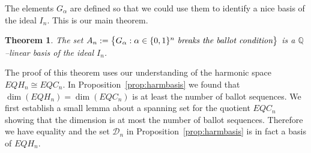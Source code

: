 \documentclass[submission]{FPSAC2023}
\newcommand{\defncolor}{\color{darkred}}
\newcommand{\defn}[1]{{\defncolor\emph{#1}}} %
\newtheorem{theorem}{Theorem}[section]
\theoremstyle{definition}
\newtheorem{example}[theorem]{Example}
\numberwithin{equation}{section}
\begin{document}
%

The elements $G_\alpha$ are defined so that we could use them to
identify a nice basis of the ideal $I_n$. This is our main theorem.

\begin{theorem}\label{thm:basisofideal}
The set $A_n:=\big\{ G_\alpha : \alpha \in \{0,1\}^n \text{ \it breaks the ballot condition}\big\}$
is a $\mathbb Q$--linear basis of the ideal $I_n$.
\end{theorem}

The proof of this theorem uses our understanding of the harmonic space $EQH_n\cong EQC_n$.
In Proposition~\ref{prop:harmbasis} we found that $\dim(EQH_n)=\dim(EQC_n)$ is at least the number of ballot sequences.
We first establish a small lemma about a spanning set for the quotient $EQC_n$ showing that  the dimension is at most  the number of ballot sequences.
Therefore we have equality
and the set ${\mathcal D}_n$ in Proposition~\ref{prop:harmbasis} is in fact a basis
of $EQH_n$.
\end{document}
